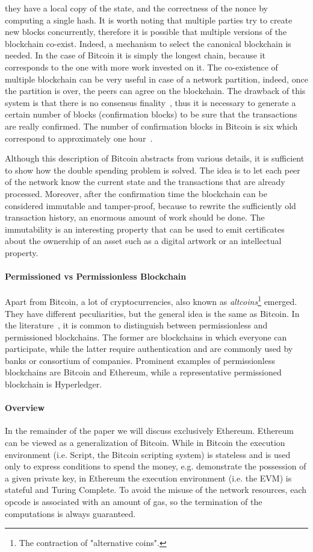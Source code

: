 they have a local copy of the state, and the correctness of the nonce by
computing a single hash. It is worth noting that multiple parties try to create
new blocks concurrently, therefore it is possible that multiple versions of the
blockchain co-exist. Indeed, a mechanism to select the canonical blockchain is
needed. In the case of Bitcoin it is simply the longest chain, because it
corresponds to the one with more work invested on it. The co-existence of
multiple blockchain can be very useful in case of a network partition, indeed,
once the partition is over, the peers can agree on the blockchain. The drawback
of this system is that there is no consensus finality~\cite{bib:the-quest}, thus
it is necessary to generate a certain number of blocks (confirmation blocks) to
be sure that the transactions are really confirmed. The number of confirmation
blocks in Bitcoin is six which correspond to approximately one
hour~\cite{bib:masteringbitcoin}.

Although this description of Bitcoin abstracts from various details, it is
sufficient to show how the double spending problem is solved. The idea is to let
each peer of the network know the current state and the transactions that are
already processed. Moreover, after the confirmation time the blockchain can be
considered immutable and tamper-proof, because to rewrite the sufficiently old
transaction history, an enormous amount of work should be done. The immutability
is an interesting property that can be used to emit certificates about the
ownership of an asset such as a digital artwork or an intellectual property.

\paragraph{Permissioned vs Permissionless Blockchain}
Apart from Bitcoin, a lot of cryptocurrencies, also known as
\emph{altcoins}\footnote{The contraction of "alternative coins".} emerged. They
have different peculiarities, but the general idea is the same as Bitcoin. In
the literature~\cite{bib:the-quest}, it is common to distinguish between
permissionless and permissioned blockchains. The former are blockchains in which
everyone can participate, while the latter require authentication and are
commonly used by banks or consortium of companies. Prominent examples of
permissionless blockchains are Bitcoin and Ethereum, while a representative
permissioned blockchain is Hyperledger.

\paragraph{Overview}
In the remainder of the paper we will discuss exclusively Ethereum. Ethereum can
be viewed as a generalization of Bitcoin. While in Bitcoin the execution
environment (i.e. Script, the Bitcoin scripting system) is stateless and is used
only to express conditions to spend the money, e.g. demonstrate the possession
of a given private key, in Ethereum the execution environment (i.e. the EVM) is
stateful and Turing Complete. To avoid the misuse of the network resources, each
opcode is associated with an amount of gas, so the termination of the
computations is always guaranteed.

